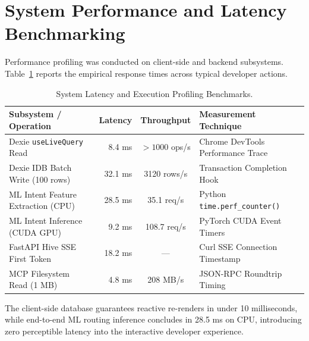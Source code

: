 \documentclass[12pt,a4paper]{report}
\begin{document}
\section{System Performance and Latency Benchmarking}
Performance profiling was conducted on client-side and backend subsystems. Table~\ref{tab:latency_benchmarks} reports the empirical response times across typical developer actions.

\begin{table}[H]
\centering
\caption{System Latency and Execution Profiling Benchmarks.}
\label{tab:latency_benchmarks}
\small
\begin{tabularx}{\textwidth}{>{\raggedright\arraybackslash}X r c >{\raggedright\arraybackslash}p{4.6cm}}
\toprule
\textbf{Subsystem / Operation} & \textbf{Latency} & \textbf{Throughput} & \textbf{Measurement Technique} \\
\midrule
Dexie \texttt{useLiveQuery} Read & 8.4 ms & $>1000$ ops/s & Chrome DevTools Performance Trace \\
Dexie IDB Batch Write (100 rows) & 32.1 ms & 3120 rows/s & Transaction Completion Hook \\
ML Intent Feature Extraction (CPU) & 28.5 ms & 35.1 req/s & Python \texttt{time.perf\_counter()} \\
ML Intent Inference (CUDA GPU) & 9.2 ms & 108.7 req/s & PyTorch CUDA Event Timers \\
FastAPI Hive SSE First Token & 18.2 ms & --- & Curl SSE Connection Timestamp \\
MCP Filesystem Read (1 MB) & 4.8 ms & 208 MB/s & JSON-RPC Roundtrip Timing \\
\bottomrule
\end{tabularx}
\end{table}

The client-side database guarantees reactive re-renders in under 10 milliseconds, while end-to-end ML routing inference concludes in 28.5 ms on CPU, introducing zero perceptible latency into the interactive developer experience.
\end{document}
